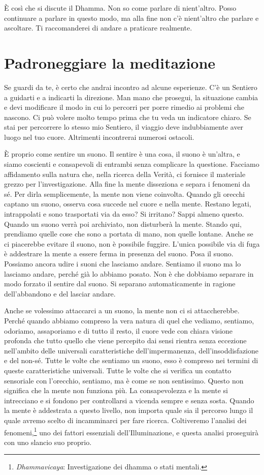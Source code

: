 È così che si discute il Dhamma. Non so come parlare di nient'altro.
Posso continuare a parlare in questo modo, ma alla fine non c'è
nient'altro che parlare e ascoltare. Ti raccomanderei di andare a
praticare realmente.

\section{Padroneggiare la meditazione}

Se guardi da te, è certo che andrai incontro ad alcune esperienze. C'è
un Sentiero a guidarti e a indicarti la direzione. Man mano che
prosegui, la situazione cambia e devi modificare il modo in cui lo
percorri per porre rimedio ai problemi che nascono. Ci può volere molto
tempo prima che tu veda un indicatore chiaro. Se stai per percorrere lo
stesso mio Sentiero, il viaggio deve indubbiamente aver luogo nel tuo
cuore. Altrimenti incontrerai numerosi ostacoli.

È proprio come sentire un suono. Il sentire è una cosa, il suono è
un'altra, e siamo coscienti e consapevoli di entrambi senza complicare
la questione. Facciamo affidamento sulla natura che, nella ricerca della
Verità, ci fornisce il materiale grezzo per l'investigazione. Alla fine
la mente disseziona e separa i fenomeni da sé. Per dirla semplicemente,
la mente non viene coinvolta. Quando gli orecchi captano un suono,
osserva cosa succede nel cuore e nella mente. Restano legati,
intrappolati e sono trasportati via da esso? Si irritano? Sappi almeno
questo. Quando un suono verrà poi archiviato, non disturberà la mente.
Stando qui, prendiamo quelle cose che sono a portata di mano, non quelle
lontane. Anche se ci piacerebbe evitare il suono, non è possibile
fuggire. L'unica possibile via di fuga è addestrare la mente a essere
ferma in presenza del suono. Posa il suono. Possiamo ancora udire i
suoni che lasciamo andare. Sentiamo il suono ma lo lasciamo andare,
perché già lo abbiamo posato. Non è che dobbiamo separare in modo
forzato il sentire dal suono. Si separano automaticamente in ragione
dell'abbandono e del lasciar andare.

Anche se volessimo attaccarci a un suono, la mente non ci si
attaccherebbe. Perché quando abbiamo compreso la vera natura di quel che
vediamo, sentiamo, odoriamo, assaporiamo e di tutto il resto, il cuore
vede con chiara visione profonda che tutto quello che viene percepito
dai sensi rientra senza eccezione nell'ambito delle universali
caratteristiche dell'impermanenza, dell'insoddisfazione e del non-sé.
Tutte le volte che sentiamo un suono, esso è compreso nei termini di
queste caratteristiche universali. Tutte le volte che si verifica un
contatto sensoriale con l'orecchio, sentiamo, ma è come se non
sentissimo. Questo non significa che la mente non funziona più. La
consapevolezza e la mente si intrecciano e si fondono per controllarsi a
vicenda sempre e senza sosta. Quando la mente è addestrata a questo
livello, non importa quale sia il percorso lungo il quale avremo scelto
di incamminarci per fare ricerca. Coltiveremo l'analisi dei
fenomeni,\footnote{\emph{Dhammavicaya}: Investigazione dei dhamma
  o stati mentali.} uno dei fattori essenziali dell'Illuminazione, e
questa analisi proseguirà con uno slancio suo proprio.

